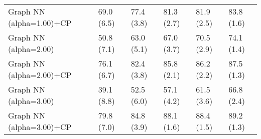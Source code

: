 \documentclass{article}
\begin{document}
\begin{table*}[t!]
\begin{center}
\begin{small}
\begin{sc}
\begin{tabular}{llllll}
Graph NN (alpha=1.00)+CP&69.0 (6.5)      &77.4 (3.8)      &81.3 (2.7)      &81.9 (2.5)      &83.8 (1.6)      \\
Graph NN (alpha=2.00)&50.8 (7.1)      &63.0 (5.1)      &67.0 (3.7)      &70.5 (2.9)      &74.1 (1.4)      \\
Graph NN (alpha=2.00)+CP&76.1 (6.7)      &82.4 (3.8)      &85.8 (2.1)      &86.2 (2.2)      &87.5 (1.3)      \\
Graph NN (alpha=3.00)&39.1 (8.8)      &52.5 (6.0)      &57.1 (4.2)      &61.5 (3.6)      &66.8 (2.4)      \\
Graph NN (alpha=3.00)+CP&79.8 (7.0)      &84.8 (3.9)      &88.1 (1.6)      &88.4 (1.5)      &89.2 (1.3)      \\
\bottomrule
\end{tabular}
\end{sc}
\end{small}
\end{center}
\vskip -0.1in
\end{table*}
\end{document}
